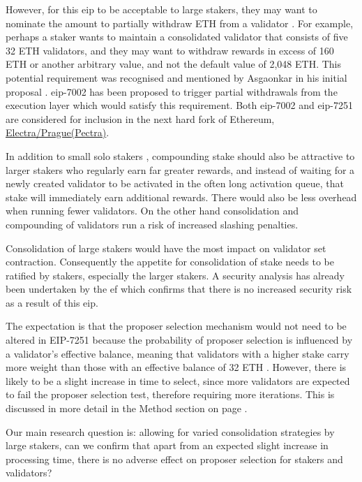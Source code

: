 \documentclass[submission,copyright,creativecommons]{eptcs}
\begin{document}
However, for this \gls{eip} to be acceptable to large stakers, they may want to nominate
the amount to partially withdraw ETH from a validator \cite{lidofaq}. For example, perhaps a staker wants to
maintain a consolidated validator that consists of five 32 ETH validators, and
they may want to withdraw rewards in excess of 160 ETH or another arbitrary value, and not the default
value of 2,048 ETH. This potential requirement was recognised and mentioned by Asgaonkar in his
initial proposal \cite{Asgaonkar2023}. \gls{eip}-7002 has been proposed to trigger partial withdrawals from the execution layer \cite{eip-7002} which would satisfy this requirement. Both \gls{eip}-7002 and \gls{eip}-7251 are considered for inclusion in the next hard fork of Ethereum, \href{https://ethereum-magicians.org/t/pectra-network-upgrade-meta-thread/16809}{Electra/Prague(Pectra)}.

In addition to small solo stakers \cite{koliopoulos2023}, compounding stake 
should also be attractive to larger stakers who regularly earn far greater
rewards, and  instead of waiting for a newly created validator to be activated
in the often long  activation queue, that stake will immediately earn additional
rewards. There would also be less overhead when running fewer validators. On the  other hand consolidation and compounding of validators run a
risk of increased slashing penalties.

Consolidation of large stakers would have the most impact on validator set contraction. Consequently the
appetite for consolidation of stake needs to be ratified by stakers, especially the larger stakers.
A security analysis has already been undertaken by the \gls{ef}
\cite{damato2023} which confirms that there is no increased security risk as a result of this \gls{eip}.

The expectation is that the proposer selection mechanism would not need to be altered in EIP-7251 because the probability of proposer selection is influenced by a validator's effective
balance, meaning that validators with a higher stake carry more weight than
those with an effective balance of 32 ETH \cite{Neuder2023a}. However, there is likely to be a slight increase in time to select, since more validators are expected to fail the proposer selection test, therefore requiring more iterations. This is discussed in more detail in the Method section on page \pageref{sec:method}.

Our main research question is: allowing for varied consolidation strategies by large stakers, can we confirm that apart from an expected slight increase in processing time, there is no adverse effect on proposer selection for stakers and validators? 
\end{document}
